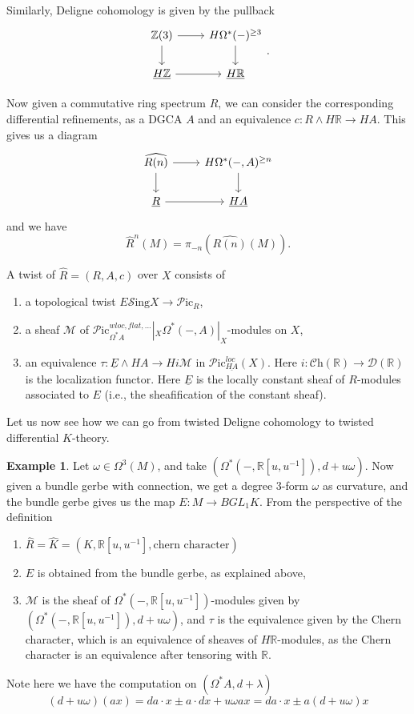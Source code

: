 \documentclass[a4paper]{book}
\newcommand{\lC}{\mathcal{C}}
\newcommand{\lD}{\mathcal{D}}
\newcommand{\lM}{\mathcal{M}}
\newcommand{\lP}{\mathcal{P}}
\newcommand{\bR}{\mathbb{R}}
\newcommand{\lS}{\mathcal{S}}
\newcommand{\bZ}{\mathbb{Z}}
\newcommand{\Sing}{\lS\mathrm{ing}} %
\newcommand{\Ch}{\lC\mathrm{h}} %
\newcommand{\Pic}{\lP\mathrm{ic}} %
\theoremstyle{definition}
\newtheorem{example}[equation]{Example}
\theoremstyle{remark}
\numberwithin{equation}{section}
\begin{document}
Similarly, Deligne cohomology is given by the pullback
\[
\begin{tikzcd}
 \bZ(3) \arrow[r] \arrow[d] & H\Omega^*(-)^{\geq 3} \arrow[d] \\
 \underline{H\bZ} \arrow[r] & \underline{H\bR} 
\end{tikzcd}.
\]

Now given a commutative ring spectrum $R$, we can consider the corresponding differential refinements, as a DGCA $A$ and an equivalence $c\colon R \wedge H\bR \to HA$. This gives us a diagram 
\[ 
\begin{tikzcd}
 \widehat{R(n)} \arrow[r] \arrow[d] & H\Omega^*(-,A)^{\geq n} \arrow[d] \\ 
 \underline{R} \arrow[r] & \underline{HA} 
\end{tikzcd}
\]
and we have 
\[
\hat{R}^n(M) = \pi_{-n}(\widehat{R(n)}(M)).
\]

A twist of $\hat{R} = (R,A,c)$ over $X$ consists of
\begin{enumerate}
  \item a topological twist $E\Sing X \to  \Pic_R$,
  \item a sheaf $\lM$ of $\Pic^{wloc,flat, ...}_{\Omega^*A}|_X \Omega^*(-,A)|_X$-modules on $X$,
  \item an equivalence $\tau\colon\underline{E} \wedge H A \to Hi\lM$ in $\Pic^{loc}_{\underline{HA}}(X)$. Here $i\colon \Ch(\bR) \to \lD(\bR)$ is the localization functor. Here $\underline{E}$ is the locally constant sheaf of $R$-modules associated to $E$ (i.e., the sheafification of the constant sheaf).
\end{enumerate}

Let us now see how we can go from twisted Deligne cohomology to twisted differential $K$-theory. 
\begin{example}
  Let $\omega \in \Omega^3(M)$, and take $(\Omega^*(-,\bR[u,u^{-1}]), d + u\omega)$. Now given a bundle gerbe with connection, we get a degree $3$-form $\omega$ as curvature, and the bundle gerbe gives us the map $E\colon M \to BGL_1K$. From the perspective of the definition 
  \begin{enumerate}
    \item $\hat{R} = \hat{K} = (K,\bR[u,u^{-1}], \text{chern character})$
    \item $E$ is obtained from the bundle gerbe, as explained above,
    \item $\lM$ is the sheaf of $\Omega^*(-,\bR[u,u^{-1}])$-modules given by $(\Omega^*(-,\bR[u,u^{-1}]), d + u\omega)$, and $\tau$ is the equivalence given by the Chern character, which is an equivalence of sheaves of $H\bR$-modules, as the Chern character is an equivalence after tensoring with $\bR$.
  \end{enumerate}
 Note here we have the computation on $(\Omega^*A, d + \lambda)$
 \[(d + u \omega)(a x) = da \cdot x \pm a \cdot dx + u\omega a x = d a \cdot x \pm a (d + u\omega) x \]
\end{example}

{\footnotesize


}
\end{document}
